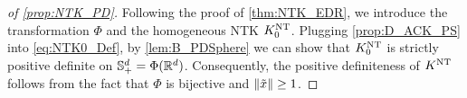 
%
%


\begin{proof}
[of \cref{prop:NTK_PD}]
  Following the proof of \cref{thm:NTK_EDR}, we introduce the transformation $\Phi$ and the homogeneous NTK $K^{\mathrm{NT}}_0$.
  Plugging \cref{prop:D_ACK_PS} into \cref{eq:NTK0_Def}, by \cref{lem:B_PDSphere} we can show that $K^{\mathrm{NT}}_0$ is strictly positive definite on
  $\mathbb{S}_{+}^{d} = \Phi(\mathbb{R}^d)$.
  Consequently, the positive definiteness of $K^{\mathrm{NT}}$ follows from the fact that $\Phi$ is bijective and $\norm{\tilde{x}} \geq 1$.
\end{proof}

